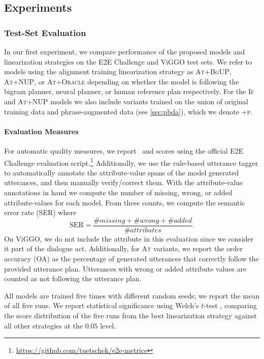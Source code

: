 \subsection{Experiments}

\subsubsection{Test-Set Evaluation}

In our first experiment, we compare performance of the proposed models and
linearization strategies on the E2E Challenge and ViGGO test sets. 
We refer to models using the alignment training linearization strategy
as \textsc{At+BgUP}, \textsc{At+NUP}, or \textsc{At+Oracle} depending
on whether the model is following the bigram planner, neural planner, or
human reference plan respectively.
For the \textsc{If}
and \textsc{At+NUP} models we also include variants trained on
the union of original training data and phrase-augmented data (see
\autoref{sec:pbda}), which we denote \textsc{+p}.

\paragraph{Evaluation Measures} For automatic quality measures, we report
\bleu~and \rougel  scores using the official E2E Challenge evaluation
script.\footnote{\url{https://github.com/tuetschek/e2e-metrics}} Additionally, we use the rule-based utterance tagger to
automatically annotate the attribute-value spans of the model generated
utterances, and then manually verify/correct them. With the attribute-value
annotations in hand we compute the number of missing, wrong, or added
attribute-values for each model. From these counts, we compute the semantic
error rate (SER) \citep{dusek2020} where \[ \textrm{SER} = \frac{\#missing +
\#wrong + \#added}{\#attributes}.\]  On ViGGO, we do not include the
 attribute in this evaluation since we consider it part of the
dialogue act.  Additionally, for \textsc{At} variants, we report the order
accuracy (OA) as the percentage of generated utterances that correctly follow
the provided utterance plan. Utterances with wrong or added attribute values
are counted as not following the utterance plan. 

All models are trained five times with different random seeds; we report
the mean of all five runs. We report statistical significance
using Welch's $t$-test \citep{welch1947}, comparing the score distribution of the five runs from the best linearization strategy against all other strategies
at the $0.05$ level.

